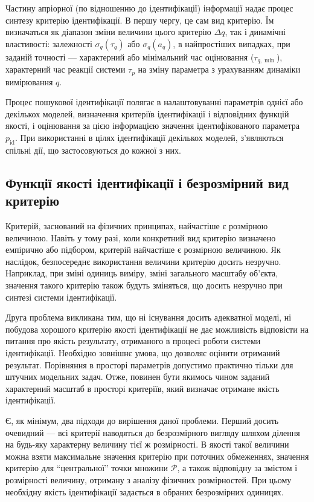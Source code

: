 Частину апріорної (по відношенню до ідентифікації) інформації
надає процес синтезу критерію ідентифікації. В першу чергу, це сам вид
критерію. Їм визначаться як діапазон зміни величини цього критерію
$\Delta q$, так і динамічні властивості: залежності
$\sigma_q (\tau_q)$ або $\sigma_q(a_q)$,
в найпростіших випадках, при заданій точності --- характерний або
мінімальний час оцінювання ($\tau_{q, \min}$),
характерний час реакції
системи $\tau_p$ на зміну параметра з урахуванням динаміки вимірювання $q$.

Процес пошукової ідентифікації полягає в налаштовуванні параметрів однієї або
декількох моделей, визначення критеріїв ідентифікації і відповідних функцій
якості, і оцінювання за цією інформацією значення ідентифікованого параметра
\label{atu:d:p_id}$p_\mathrm{id}$. При використанні в цілях
ідентифікації декількох моделей, з'являються спільні дії, що застосовуються до
кожної з них.




\subsection{Функції якості ідентифікації і безрозмірний вид критерію} %


Критерій, заснований на фізичних принципах, найчастіше є розмірною величиною.
Навіть у тому разі, коли конкретний вид критерію визначено емпірично або
підбором, критерій найчастіше є розмірною величиною.
Як наслідок, безпосереднє
використання величини критерію досить незручно. Наприклад, при зміні одиниць
виміру, зміні загального масштабу об'єкта, значення такого критерію також
будуть зміняться, що досить незручно при синтезі системи ідентифікації.

Друга проблема викликана тим, що ні існування досить
адекватної моделі, ні побудова хорошого критерію якості
ідентифікації не дає можливість відповісти на питання
про якість результату, отриманого в процесі роботи системи
ідентифікації. Необхідно зовнішнє умова, що дозволяє оцінити
отриманий результат. Порівняння в просторі параметрів допустимо
практично тільки для штучних модельних задач. Отже, повинен
бути якимось чином заданий характерний масштаб в просторі
критеріїв, який визначає отримане якість ідентифікації.

Є, як мінімум, два підходи до вирішення даної проблеми. Перший
досить очевидний --- всі критерії наводяться до безрозмірного
вигляду шляхом ділення на будь-яку характерну величину тієї ж
розмірності. В якості такої величини можна взяти максимальне
значення критерію при поточних обмеженнях, значення критерію
для ``центральної'' точки множини $\mathcal{P}$,
а також відповідну за змістом і розмірності величину,
отриману з аналізу фізичних розмірностей. При цьому необхідну
якість ідентифікації задається в обраних безрозмірних одиницях.

